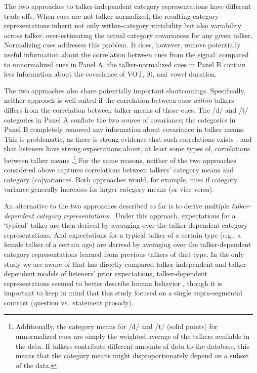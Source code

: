 \documentclass[
  11pt,
  man,mask,floatsintext]{apa6}
\begin{document}
The two approaches to talker-independent category representations have different trade-offs. When cues are not talker-normalized, the resulting category representations inherit not only within-category variability but also variability across talker, over-estimating the actual category covariances for any given talker. Normalizing cues addresses this problem. It does, however, remove potentially useful information about the correlation between cues from the signal: compared to unnormalized cues in Panel A, the talker-normalized cues in Panel B contain less information about the covariance of VOT, f0, and vowel duration.

The two approaches also share potentially important shortcomings. Specifically, neither approach is well-suited if the correlation between cues \emph{within} talkers differs from the correlation between talker means of those cues. The /d/ and /t/ categories in Panel A conflate the two source of covariance; the categories in Panel B completely removed any information about covariance in talker means. This is problematic, as there is strong evidence that such correlations exists \autocite{chodroff-wilson2017,chodroff-wilson2018,theodore2009,sonderegger2020}, and that listeners have strong expectations about, at least some types of, correlations between talker means \autocites[e.g.,][]{idemaru-holt2011,idemaru-holt2020,schertz2016}.\footnote{Additionally, the category means for /d/ and /t/ (solid points) for unnormalized cues are simply the weighted average of the talkers available in the data. If talkers contribute different amounts of data to the database, this means that the category means might disproportionately depend on a subset of the data.} For the same reasons, neither of the two approaches considered above captures correlations between talkers' category means and category (co)variances. Both approaches would, for example, miss if category variance generally increases for larger category means (or vice versa).

An alternative to the two approaches described so far is to derive multiple \emph{talker-dependent category representations} \autocite[as assumed in e.g.,][]{kleinschmidt-jaeger2015}. Under this approach, expectations for a `typical' talker are then derived by averaging over the talker-dependent category representations. And expectations for a typical talker of a certain type (e.g., a female talker of a certain age) are derived by averaging over the talker-dependent category representations learned from previous talkers of that type. In the only study we are aware of that has directly compared talker-independent and talker-dependent models of listeners' prior expectations, talker-dependent representations seemed to better describe human behavior \autocite{xie2021cognition}, though it is important to keep in mind that this study focused on a single supra-segmental contrast (question vs.~statement prosody).
\end{document}
